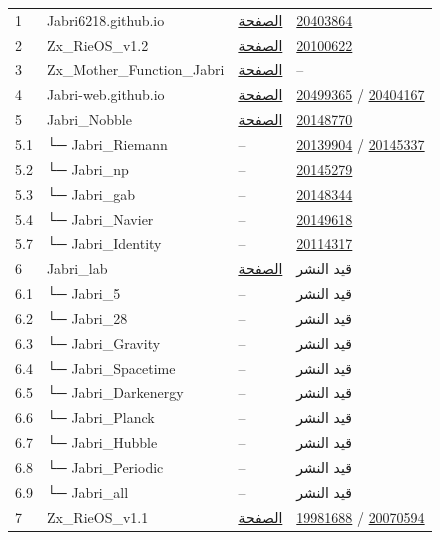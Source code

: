 \documentclass[a4paper,11pt]{article}
\begin{document}
\begin{otherlanguage}{arabic}
\begin{longtable}{>{\raggedright}p{1.2cm} >{\raggedright}p{3.5cm} >{\raggedright}p{3.5cm} >{\raggedright}p{3.5cm}}
1 & Jabri6218.github.io & \href{https://jabri-web.github.io/jabri62018.github.io/}{الصفحة} & \href{https://doi.org/10.5281/zenodo.20403864}{20403864} \\
2 & Zx\_RieOS\_v1.2 & \href{https://jabri-web.github.io/Zx_RieOS_v1.2/}{الصفحة} & \href{https://doi.org/10.5281/zenodo.20100622}{20100622} \\
3 & Zx\_Mother\_Function\_Jabri & \href{https://Jabri-web.github.io/Zx_Mother_Function_Jabri/}{الصفحة} & -- \\
4 & Jabri-web.github.io & \href{https://Jabri-web.github.io/}{الصفحة} & \href{https://doi.org/10.5281/zenodo.20499365}{20499365} / \href{https://doi.org/10.5281/zenodo.20404167}{20404167} \\
5 & Jabri\_Nobble & \href{https://jabri-web.github.io/Jabri_Nobble/}{الصفحة} & \href{https://doi.org/10.5281/zenodo.20148770}{20148770} \\
5.1 & └─ Jabri\_Riemann & -- & \href{https://doi.org/10.5281/zenodo.20139904}{20139904} / \href{https://doi.org/10.5281/zenodo.20145337}{20145337} \\
5.2 & └─ Jabri\_np & -- & \href{https://doi.org/10.5281/zenodo.20145279}{20145279} \\
5.3 & └─ Jabri\_gab & -- & \href{https://doi.org/10.5281/zenodo.20148344}{20148344} \\
5.4 & └─ Jabri\_Navier & -- & \href{https://doi.org/10.5281/zenodo.20149618}{20149618} \\
5.7 & └─ Jabri\_Identity & -- & \href{https://doi.org/10.5281/zenodo.20114317}{20114317} \\
6 & Jabri\_lab & \href{https://jabri-web.github.io/jabri_lab/}{الصفحة} & قيد النشر \\
6.1 & └─ Jabri\_5 & -- & قيد النشر \\
6.2 & └─ Jabri\_28 & -- & قيد النشر \\
6.3 & └─ Jabri\_Gravity & -- & قيد النشر \\
6.4 & └─ Jabri\_Spacetime & -- & قيد النشر \\
6.5 & └─ Jabri\_Darkenergy & -- & قيد النشر \\
6.6 & └─ Jabri\_Planck & -- & قيد النشر \\
6.7 & └─ Jabri\_Hubble & -- & قيد النشر \\
6.8 & └─ Jabri\_Periodic & -- & قيد النشر \\
6.9 & └─ Jabri\_all & -- & قيد النشر \\
7 & Zx\_RieOS\_v1.1 & \href{https://Jabri-web.github.io/Zx_RieOS_v1.1/}{الصفحة} & \href{https://doi.org/10.5281/zenodo.19981688}{19981688} / \href{https://doi.org/10.5281/zenodo.20070594}{20070594} \\

\end{longtable}
\end{otherlanguage}
\end{document}
